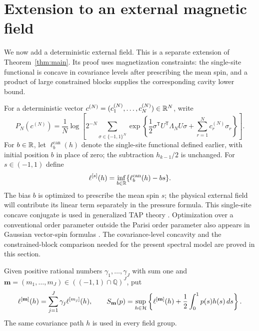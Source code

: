 \section{Extension to an external magnetic field}\label{sec:magnetic}

We now add a deterministic external field. This is a separate extension of
Theorem~\ref{thm:main}. Its proof uses magnetization constraints: the
single-site functional is concave in covariance levels after prescribing
the mean spin, and a product of large constrained blocks supplies the
corresponding cavity lower bound.

For a deterministic vector $c^{(N)}=(c_1^{(N)},\ldots,c_N^{(N)})\in\mathbb R^N$,
write
\begin{equation}\label{mag:pressure}
 P_N(c^{(N)})=\frac1N\log\left[
  2^{-N}\sum_{\sigma\in\{-1,1\}^N}
  \exp\left\{\frac12\sigma^{\mathsf T}U^{\mathsf T}\Lambda_NU\sigma
                    +\sum_{r=1}^N c_r^{(N)}\sigma_r\right\}\right].
\end{equation}
For $b\in\mathbb R$, let $\ell_b^{\mathrm{can}}(h)$ denote the single-site
functional defined earlier, with initial position $b$ in place of zero;
the subtraction $h_{k-1}/2$ is unchanged. For $s\in(-1,1)$ define
\begin{equation}\label{mag:constrained-functional}
 \ell^{[s]}(h)=\inf_{b\in\mathbb R}
       \{\ell_b^{\mathrm{can}}(h)-bs\}.
\end{equation}
The bias $b$ is optimized to prescribe the mean spin $s$; the physical
external field will contribute its linear term separately in the pressure
formula. This single-site concave conjugate is used in generalized TAP theory
\cite[\S2.3, equations~(2.21)--(2.23)]{ChenPanchenkoSubag2023}.
Optimization over a conventional order parameter outside the
Parisi order parameter also appears in Gaussian vector-spin formulas
\cite[Theorem~1.1]{ChenConventional2024}.
The covariance-level concavity and the constrained-block comparison
needed for the present spectral model are proved in this section.

Given positive rational numbers $\gamma_1,\ldots,\gamma_J$ with sum one
and $\mathbf m=(m_1,\ldots,m_J)\in((-1,1)\cap\mathbb Q)^J$, put
\begin{equation}\label{mag:Sm}
 \ell^{[\mathbf m]}(h)=\sum_{j=1}^J\gamma_j\ell^{[m_j]}(h),
 \qquad
 S_{\mathbf m}(p)=\sup_{h\in\mathcal H}
       \left\{\ell^{[\mathbf m]}(h)+\frac12\int_0^1p(s)h(s)\,ds\right\}.
\end{equation}
The same covariance path $h$ is used in every field group.

